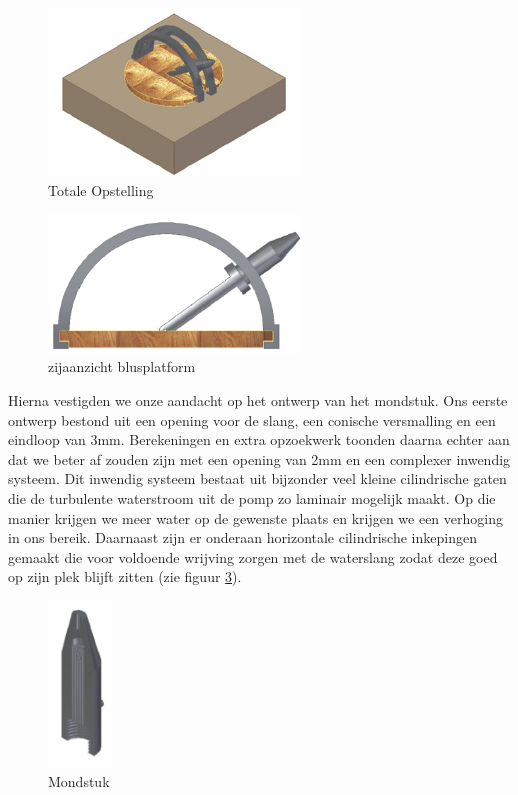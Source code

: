 \documentclass{kulakarticle}
\begin{document}
\begin{figure}[H]
	\centering
        \label{figbompakanon_2}
	\includegraphics[width=0.6\textwidth]{Afbeeldingen/bompakanon.png}
        \caption{Totale Opstelling}
 
\end{figure}
\begin{figure}[H]
	\centering
        \label{figZijAanzicht}
	\includegraphics[width=0.6\textwidth]{Afbeeldingen/Screen_ZijAanzicht.png}
        \caption{zijaanzicht blusplatform}
 
\end{figure}

Hierna vestigden we onze aandacht op het ontwerp van het mondstuk. Ons eerste ontwerp bestond uit een opening voor de slang, een conische versmalling en een eindloop van 3mm. Berekeningen en extra opzoekwerk toonden daarna echter aan dat we beter af zouden zijn met een opening van 2mm en een complexer inwendig systeem. Dit inwendig systeem bestaat uit bijzonder veel kleine cilindrische gaten die de turbulente waterstroom uit de pomp zo laminair mogelijk maakt. Op die manier krijgen we meer water op de gewenste plaats en krijgen we een verhoging in ons bereik. Daarnaast zijn er onderaan horizontale cilindrische inkepingen gemaakt die voor voldoende wrijving zorgen met de waterslang zodat deze goed op zijn plek blijft zitten (zie figuur \ref{figmondstuk}).
\begin{figure}[H]
	\centering
        \label{figmondstuk}
	\includegraphics[width=0.15\textwidth]{Afbeeldingen/mondstuk.png}
        \caption{Mondstuk}
 
\end{figure}
\end{document}

